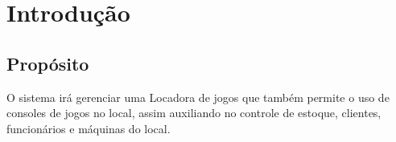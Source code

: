 \documentclass{article}
\begin{document}

\capa



\tableofcontents
\newpage

\section{Introdução}
\subsection{Propósito}
O sistema irá gerenciar uma Locadora de jogos que também permite o uso de consoles de jogos no local, assim auxiliando no controle de estoque, clientes, funcionários e máquinas do local.
\end{document}
